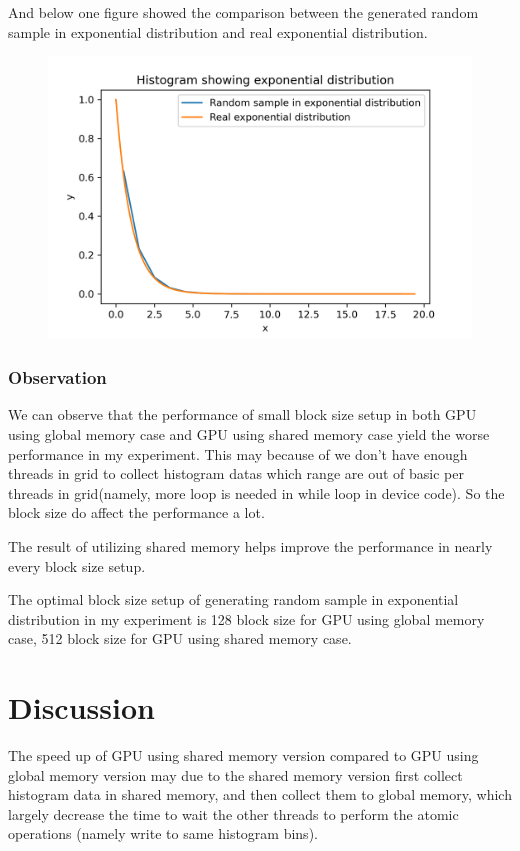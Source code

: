\documentclass{article}
\begin{document}
	And below one figure showed the comparison between the generated random sample in exponential distribution and real exponential distribution.
	\begin{figure}[hb!]
		\centering
		\includegraphics[width=\linewidth]{notebook/histogram}
	\end{figure}

	\subsubsection{Observation}
	We can observe that the performance of small block size setup in both GPU using global memory case and GPU using shared memory case yield the worse performance in my experiment. This may because of we don't have enough threads in grid to collect histogram datas which range are out of basic per threads in grid(namely, more loop is needed in while loop in device code). So the block size do affect the performance a lot.
	
	The result of utilizing shared memory helps improve the performance in nearly every block size setup. 
	
	The optimal block size setup of generating random sample in exponential distribution in my experiment is 128 block size for GPU using global memory case, 512 block size for GPU using shared memory case.
	
	\section{Discussion}
	The speed up of GPU using shared memory version compared to GPU using global memory version may due to the shared memory version first collect histogram data in shared memory, and then collect them to global memory, which largely decrease the time to wait the other threads to perform the atomic operations (namely write to same histogram bins).
\end{document}
